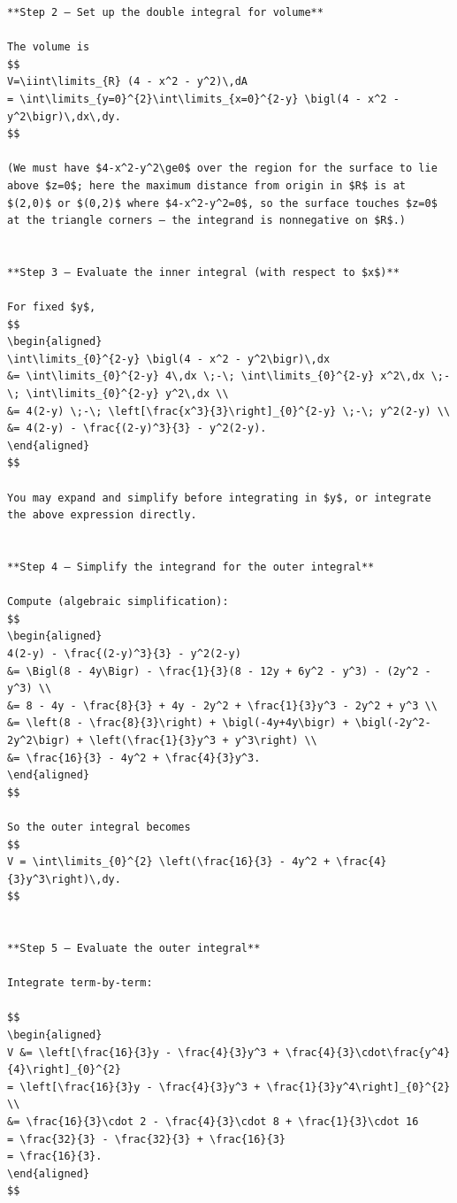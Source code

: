 \documentclass[
  letterpaper,
  DIV=11,
  numbers=noendperiod]{scrreprt}
\begin{document}
\begin{verbatim}
**Step 2 — Set up the double integral for volume**

The volume is
$$
V=\iint\limits_{R} (4 - x^2 - y^2)\,dA
= \int\limits_{y=0}^{2}\int\limits_{x=0}^{2-y} \bigl(4 - x^2 - y^2\bigr)\,dx\,dy.
$$

(We must have $4-x^2-y^2\ge0$ over the region for the surface to lie above $z=0$; here the maximum distance from origin in $R$ is at $(2,0)$ or $(0,2)$ where $4-x^2-y^2=0$, so the surface touches $z=0$ at the triangle corners — the integrand is nonnegative on $R$.)


**Step 3 — Evaluate the inner integral (with respect to $x$)**

For fixed $y$,
$$
\begin{aligned}
\int\limits_{0}^{2-y} \bigl(4 - x^2 - y^2\bigr)\,dx
&= \int\limits_{0}^{2-y} 4\,dx \;-\; \int\limits_{0}^{2-y} x^2\,dx \;-\; \int\limits_{0}^{2-y} y^2\,dx \\
&= 4(2-y) \;-\; \left[\frac{x^3}{3}\right]_{0}^{2-y} \;-\; y^2(2-y) \\
&= 4(2-y) - \frac{(2-y)^3}{3} - y^2(2-y).
\end{aligned}
$$

You may expand and simplify before integrating in $y$, or integrate the above expression directly.


**Step 4 — Simplify the integrand for the outer integral**

Compute (algebraic simplification):
$$
\begin{aligned}
4(2-y) - \frac{(2-y)^3}{3} - y^2(2-y)
&= \Bigl(8 - 4y\Bigr) - \frac{1}{3}(8 - 12y + 6y^2 - y^3) - (2y^2 - y^3) \\
&= 8 - 4y - \frac{8}{3} + 4y - 2y^2 + \frac{1}{3}y^3 - 2y^2 + y^3 \\
&= \left(8 - \frac{8}{3}\right) + \bigl(-4y+4y\bigr) + \bigl(-2y^2-2y^2\bigr) + \left(\frac{1}{3}y^3 + y^3\right) \\
&= \frac{16}{3} - 4y^2 + \frac{4}{3}y^3.
\end{aligned}
$$

So the outer integral becomes
$$
V = \int\limits_{0}^{2} \left(\frac{16}{3} - 4y^2 + \frac{4}{3}y^3\right)\,dy.
$$


**Step 5 — Evaluate the outer integral**

Integrate term-by-term:

$$
\begin{aligned}
V &= \left[\frac{16}{3}y - \frac{4}{3}y^3 + \frac{4}{3}\cdot\frac{y^4}{4}\right]_{0}^{2}
= \left[\frac{16}{3}y - \frac{4}{3}y^3 + \frac{1}{3}y^4\right]_{0}^{2} \\
&= \frac{16}{3}\cdot 2 - \frac{4}{3}\cdot 8 + \frac{1}{3}\cdot 16
= \frac{32}{3} - \frac{32}{3} + \frac{16}{3}
= \frac{16}{3}.
\end{aligned}
$$


\end{verbatim}
\end{document}
